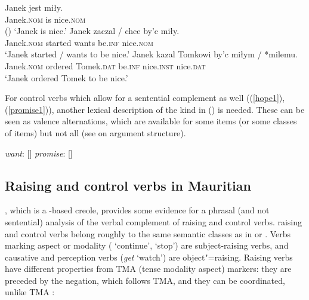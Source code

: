 \begin{exe}
\ex \begin{xlist}
\ex 
\gll Janek jest miły.\\
     Janek.\textsc{nom} is nice.\textsc{nom} \\ \hfill()
\glt `Janek is nice.'
\ex 
\gll Janek              zaczal  /  chce  by'c            miły.\\
     Janek.\textsc{nom} started {} wants be.\textsc{inf} nice.\textsc{nom} \\ 
\glt `Janek started / wants to be nice.'
\ex 
\gll Janek              kazal   Tomkowi            by'c            miłym              / *milemu.\\
     Janek.\textsc{nom} ordered Tomek.\textsc{dat} be.\textsc{inf} nice.\textsc{inst} {} \hphantom{*}nice.\textsc{dat} \\ 
\glt `Janek ordered Tomek to be nice.'
	\end{xlist}
\end{exe}


For control verbs which allow for a sentential complement as well ((\ref{hope1}), (\ref{promise1})),
another lexical description of the kind in () is needed. These can be seen as valence alternations, which are
available for some items (or some classes of items) but not all (see  on argument structure).

\eal
\ex \emph{want}: [\argst {}]
\ex \emph{promise}: [\argst {}]
\zl




\subsection{Raising and control verbs in Mauritian}\label{sec-maurit}

%
\largerpage
{}, which is a -based creole, provides some evidence for a phrasal (and not sentential) analysis of the verbal complement of raising and control verbs.
 raising and control verbs belong
roughly to the same semantic classes as in  or . Verbs marking aspect or
modality ( `continue',  `stop') are subject-raising verbs, and causative and
perception verbs (\emph{get} `watch') are object"=raising. Raising verbs have different properties from TMA (tense
modality aspect) markers: they are preceded by the negation, which follows
TMA, and they can be coordinated, unlike TMA \citep[]{HenriandLaurens2011}:

